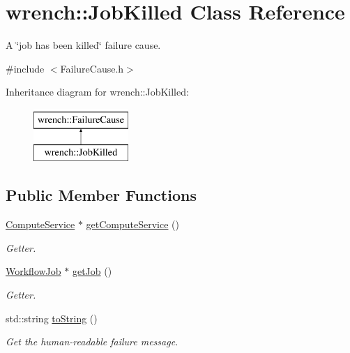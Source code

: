 \hypertarget{classwrench_1_1_job_killed}{}\section{wrench\+:\+:Job\+Killed Class Reference}
\label{classwrench_1_1_job_killed}


A \char`\"{}job has been killed\char`\"{} failure cause.  




{\ttfamily \#include $<$Failure\+Cause.\+h$>$}

Inheritance diagram for wrench\+:\+:Job\+Killed\+:\begin{figure}[H]
\begin{center}
\leavevmode
\includegraphics[height=2.000000cm]{classwrench_1_1_job_killed}
\end{center}
\end{figure}
\subsection*{Public Member Functions}
\begin{DoxyCompactItemize}
\item 
\hyperlink{classwrench_1_1_compute_service}{Compute\+Service} $\ast$ \hyperlink{classwrench_1_1_job_killed_a448c858885b28a03399103494ad85e5b}{get\+Compute\+Service} ()
\begin{DoxyCompactList}\small\item\em Getter. \end{DoxyCompactList}\item 
\hyperlink{classwrench_1_1_workflow_job}{Workflow\+Job} $\ast$ \hyperlink{classwrench_1_1_job_killed_a12b56e54f07217a9b0a3f3f67b001132}{get\+Job} ()
\begin{DoxyCompactList}\small\item\em Getter. \end{DoxyCompactList}\item 
std\+::string \hyperlink{classwrench_1_1_job_killed_aa9c6b749d16db4a313ffdd83629f1c76}{to\+String} ()
\begin{DoxyCompactList}\small\item\em Get the human-\/readable failure message. \end{DoxyCompactList}\end{DoxyCompactItemize}
